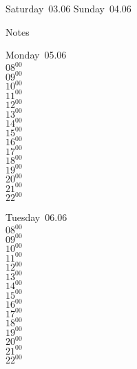 \documentclass[11pt,a4paper]{book}\usepackage[]{graphicx}\usepackage[]{color}
\begin{document}
\begin{weekendbox}
  Saturday~03.06
  \tcblower
  Sunday~04.06
\end{weekendbox} %
\begin{notebox}
  Notes
\end{notebox}
\clearpage
\begin{headerbox}
\end{headerbox}
\begin{weekdaybox}
  Monday~05.06\\
  { 
  \vfill
  $08^{00}$\\
$09^{00}$\\
$10^{00}$\\
$11^{00}$\\
$12^{00}$\\
$13^{00}$\\
$14^{00}$\\
$15^{00}$\\
$16^{00}$\\
$17^{00}$\\
$18^{00}$\\
$19^{00}$\\
$20^{00}$\\
$21^{00}$\\
$22^{00}$\\
  }
\end{weekdaybox}
\begin{weekdaybox}
  Tuesday~06.06\\
  { 
  \vfill
  $08^{00}$\\
$09^{00}$\\
$10^{00}$\\
$11^{00}$\\
$12^{00}$\\
$13^{00}$\\
$14^{00}$\\
$15^{00}$\\
$16^{00}$\\
$17^{00}$\\
$18^{00}$\\
$19^{00}$\\
$20^{00}$\\
$21^{00}$\\
$22^{00}$\\
  }
\end{weekdaybox}
\end{document}
